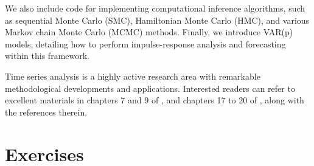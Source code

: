 We also include code for implementing computational inference algorithms, such as sequential Monte Carlo (SMC), Hamiltonian Monte Carlo (HMC), and various Markov chain Monte Carlo (MCMC) methods. Finally, we introduce VAR(p) models, detailing how to perform impulse-response analysis and forecasting within this framework.

Time series analysis is a highly active research area with remarkable methodological developments and applications. Interested readers can refer to excellent materials in chapters 7 and 9 of \cite{geweke2011oxford}, and chapters 17 to 20 of \cite{chan2019bayesian}, along with the references therein.

\section{Exercises}\label{sec86}

